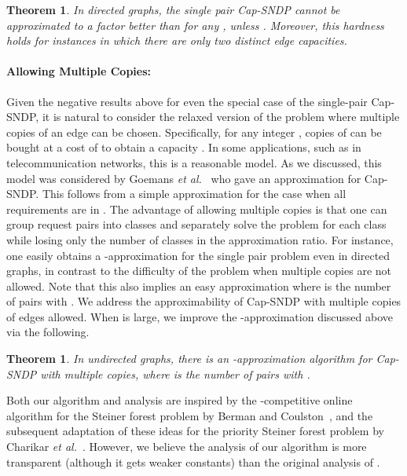 \documentclass[11pt]{article}
\newcounter{thm0Rcopies}
\newcounter{thm_saved}
\newtheorem{theorem}[lemma]{Theorem}
\newcommand{\etal}{{\em et al.}\ }
\begin{document}
\begin{theorem}\label{thm:stHardness}
  In {\em directed} graphs, the single pair Cap-SNDP cannot be approximated to a
  factor better than  for any ,
  unless . Moreover, this hardness
  holds for instances in which there are only two distinct edge capacities.
\end{theorem}


\paragraph{Allowing Multiple Copies:} Given the negative results above
for even the special case of the single-pair Cap-SNDP, it is natural
to consider the relaxed version of the problem where multiple copies
of an edge can be chosen. Specifically, for any integer ,
 copies of  can be bought at a cost of  to
obtain a capacity .  In some applications, such as in
telecommunication networks, this is a reasonable model. As we
discussed, this model was considered by Goemans \etal \cite{GG+} who
gave an  approximation for Cap-SNDP. This follows
from a simple  approximation for the case when all requirements
are in .  The advantage of allowing multiple copies is that
one can group request pairs into classes and separately solve the
problem for each class while losing only the number of classes in the
approximation ratio.  For instance, one easily obtains a
-approximation for the single pair problem even in directed graphs,
in contrast to the difficulty of the problem when multiple copies are
not allowed. Note that this also implies an easy  approximation
where  is the number of pairs with . We address the
approximability of Cap-SNDP with multiple copies of edges allowed.
When  is large, we improve the -approximation discussed above via the following.

\begin{theorem}\label{thm:multipleCopies}
  In undirected graphs, there is an -approximation
  algorithm for Cap-SNDP with multiple copies, where  is the number
  of pairs with .
\end{theorem}

Both our algorithm and analysis are inspired by the
-competitive online algorithm for the Steiner forest
problem by Berman and Coulston~\cite{BC}, and the subsequent
adaptation of these ideas for the priority Steiner forest problem by
Charikar \etal \cite{CNS}. However, we believe the analysis of our
algorithm is more transparent (although it gets weaker constants) than
the original analysis of \cite{BC}.
\end{document}
